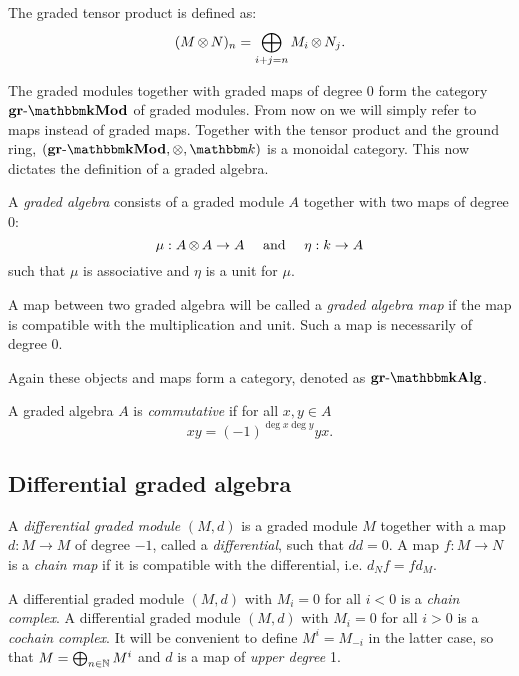 \begin{definition}
	The graded tensor product is defined as:
	$$ (M \operatorname*{\otimes} N)_n = \bigoplus_{i + j = n} M_i \operatorname*{\otimes} N_j. $$
\end{definition}

The graded modules together with graded maps of degree $0$ form the category $\grMod{\k}$ of graded modules. From now on we will simply refer to maps instead of graded maps. Together with the tensor product and the ground ring, $(\grMod{\k}, \tensor, \k)$ is a monoidal category. This now dictates the definition of a graded algebra.

\begin{definition}
	A \emph{graded algebra} consists of a graded module $A$ together with two maps of degree $0$:
	$$ \mu: A \operatorname*{\otimes} A \to A \quad\text{ and }\quad \eta: k \to A $$
	such that $\mu$ is associative and $\eta$ is a unit for $\mu$.

	A map between two graded algebra will be called a \emph{graded algebra map} if the map is compatible with the multiplication and unit. Such a map is necessarily of degree $0$.
\end{definition}

Again these objects and maps form a category, denoted as $\grAlg{\k}$.

\begin{definition}
	A graded algebra $A$ is \emph{commutative} if for all $x, y \in A$
	$$ xy = (-1)^{\deg{x}\deg{y}} yx. $$
\end{definition}



\subsection{Differential graded algebra}

\begin{definition}
	A \emph{differential graded module} $(M, d)$ is a graded module $M$ together with a map $d: M \to M$ of degree $-1$, called a \emph{differential}, such that $dd = 0$. A map $f: M \to N$ is a \emph{chain map} if it is compatible with the differential, i.e. $d_N f = f d_M$.
\end{definition}

A differential graded module $(M, d)$ with $M_i = 0$ for all $i < 0$ is a \emph{chain complex}. A differential graded module $(M, d)$ with $M_i = 0$ for all $i > 0$ is a \emph{cochain complex}. It will be convenient to define $M^i = M_{-i}$ in the latter case, so that $M = \bigoplus_{n \in \mathbb{N}} M^i$ and $d$ is a map of \emph{upper degree} 1.

